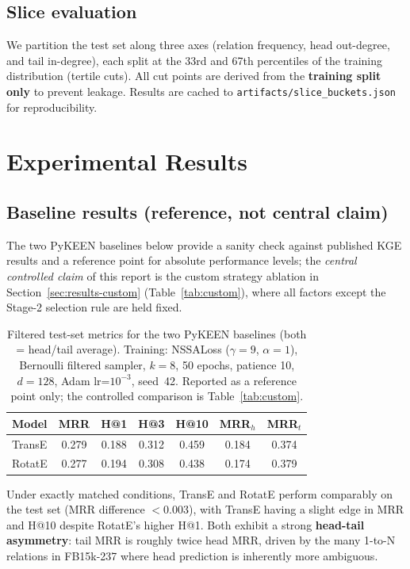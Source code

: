 \documentclass[10pt,twocolumn,letterpaper]{article}
\begin{document}
\subsection{Slice evaluation}

We partition the test set along three axes (relation frequency, head
out-degree, and tail in-degree), each split at the 33rd and 67th percentiles
of the training distribution (tertile cuts). All cut points are derived from
the \textbf{training split only} to prevent leakage. Results are cached to
\texttt{artifacts/slice\_buckets.json} for reproducibility.

\section{Experimental Results}
\label{sec:results}

\subsection{Baseline results (reference, not central claim)}

The two PyKEEN baselines below provide a sanity check against published
KGE results and a reference point for absolute performance levels;
the \emph{central controlled claim} of this report is the custom strategy
ablation in Section~\ref{sec:results-custom} (Table~\ref{tab:custom}),
where all factors except the Stage-2 selection rule are held fixed.

\begin{table}[ht]
\centering\small
\caption{Filtered test-set metrics for the two PyKEEN baselines
(both = head/tail average). Training: NSSALoss ($\gamma=9$, $\alpha=1$),
Bernoulli filtered sampler, $k=8$, 50 epochs, patience 10, $d=128$,
Adam lr=$10^{-3}$, seed~42. Reported as a reference point only;
the controlled comparison is Table~\ref{tab:custom}.}
\label{tab:baselines}
\begin{tabular}{@{}lcccccc@{}}
\toprule
Model & MRR & H@1 & H@3 & H@10 & MRR$_h$ & MRR$_t$ \\
\midrule
TransE  & 0.279 & 0.188 & 0.312 & 0.459 & 0.184 & 0.374 \\
RotatE  & 0.277 & 0.194 & 0.308 & 0.438 & 0.174 & 0.379 \\
\bottomrule
\end{tabular}
\end{table}

Under exactly matched conditions, TransE and RotatE perform comparably on
the test set (MRR difference $<0.003$), with TransE having a slight edge in
MRR and H@10 despite RotatE's higher H@1. Both exhibit a strong
\textbf{head-tail asymmetry}: tail MRR is roughly twice head MRR, driven by
the many 1-to-N relations in FB15k-237 where head prediction is inherently
more ambiguous.
\end{document}
